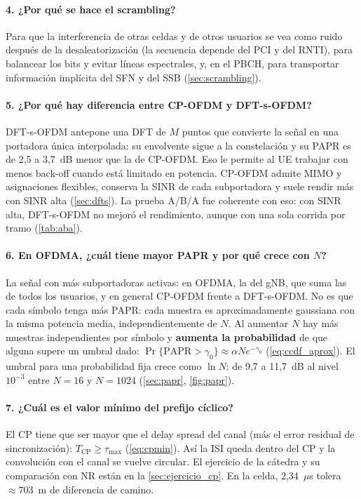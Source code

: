 \paragraph{4. ¿Por qué se hace el scrambling?}
Para que la interferencia de otras celdas y de otros usuarios se vea como ruido después de la desaleatorización (la secuencia depende del PCI y del RNTI), para balancear los bits y evitar líneas espectrales, y, en el PBCH, para transportar información implícita del SFN y del SSB (\cref{sec:scrambling}).

\paragraph{5. ¿Por qué hay diferencia entre CP-OFDM y DFT-s-OFDM?}
DFT-s-OFDM antepone una DFT de $M$ puntos que convierte la señal en una portadora única interpolada: su envolvente sigue a la constelación y su PAPR es de 2,5 a 3,7~dB menor que la de CP-OFDM. Eso le permite al UE trabajar con menos back-off cuando está limitado en potencia. CP-OFDM admite MIMO y asignaciones flexibles, conserva la SINR de cada subportadora y suele rendir más con SINR alta (\cref{sec:dfts}). La prueba A/B/A fue coherente con eso: con SINR alta, DFT-s-OFDM no mejoró el rendimiento, aunque con una sola corrida por tramo (\cref{tab:aba}).

\paragraph{6. En OFDMA, ¿cuál tiene mayor PAPR y por qué crece con $N$?}
La señal con más subportadoras activas: en OFDMA, la del gNB, que suma las de todos los usuarios, y en general CP-OFDM frente a DFT-s-OFDM. No es que cada símbolo tenga más PAPR: cada muestra es aproximadamente gaussiana con la misma potencia media, independientemente de $N$. Al aumentar $N$ hay más muestras independientes por símbolo y \textbf{aumenta la probabilidad} de que alguna supere un umbral dado: $\Pr\{\text{PAPR}>\gamma_0\}\approx \alpha N e^{-\gamma_0}$ (\cref{eq:ccdf_aprox}). El umbral para una probabilidad fija crece como $\ln N$: de 9,7 a 11,7~dB al nivel $10^{-3}$ entre $N=16$ y $N=1024$ (\cref{sec:papr}, \cref{fig:papr}).

\paragraph{7. ¿Cuál es el valor mínimo del prefijo cíclico?}
El CP tiene que ser mayor que el delay spread del canal (más el error residual de sincronización): $T_\text{CP}\ge \tau_\text{max}$ (\cref{eq:cpmin}). Así la ISI queda dentro del CP y la convolución con el canal se vuelve circular. El ejercicio de la cátedra y su comparación con NR están en la \cref{sec:ejercicio_cp}. En la celda, 2,34~$\mu$s tolera $\approx 703$~m de diferencia de camino.

